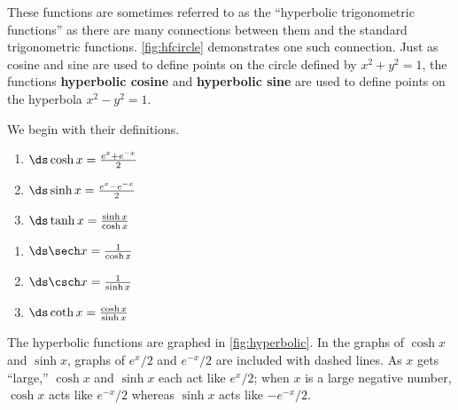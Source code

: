 These functions are sometimes referred to as the ``hyperbolic trigonometric functions'' as there are many connections between them and the standard trigonometric functions. \autoref{fig:hfcircle} demonstrates one such connection. Just as cosine and sine are used to define points on the circle defined by $x^2+y^2=1$, the functions \textbf{hyperbolic cosine} and \textbf{hyperbolic sine} are used to define points on the hyperbola $x^2-y^2=1$.

We begin with their definitions.

{\noindent%
\begin{minipage}{.5\specialboxlength}%
\begin{enumerate}
\item		$\ds \cosh x = \frac{e^x+e^{-x}}2$
\item		$\ds \sinh x = \frac{e^x-e^{-x}}2$
\item		$\ds \tanh x = \frac{\sinh x}{\cosh x}$
\end{enumerate}
\end{minipage}%
\begin{minipage}{.5\specialboxlength}
\begin{enumerate}\addtocounter{enumi}{3}
\item		$\ds \sech x = \frac{1}{\cosh x}$
\item		$\ds \csch x = \frac{1}{\sinh x}$
\item		$\ds \coth x = \frac{\cosh x}{\sinh x}$
\end{enumerate}
\end{minipage}}

The hyperbolic functions are graphed in \autoref{fig:hyperbolic}. In the graphs of $\cosh x$ and $\sinh x$, graphs of $e^x/2$ and $e^{-x}/2$ are included with dashed lines. As $x$ gets ``large,'' $\cosh x$ and $\sinh x$ each act like $e^x/2$; when $x$ is a large negative number, $\cosh x$ acts like $e^{-x}/2$ whereas $\sinh x$ acts like $-e^{-x}/2$.


